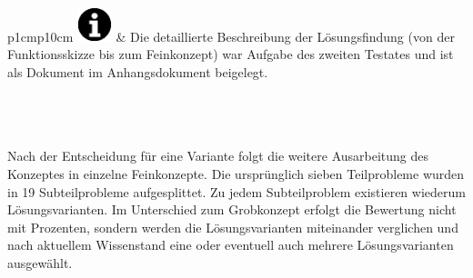 \begin{tabular}{p{1cm}p{10cm}}
		{\includegraphics[width=1cm]{Enddokumentation/Varianten/Bilder/info_icon.png}}
	 & Die detaillierte Beschreibung der Lösungsfindung (von der Funktionsskizze bis zum
	 Feinkonzept) war Aufgabe des zweiten Testates und ist als Dokument im Anhangsdokument beigelegt. \\
\end{tabular}\\
\\
\\
Nach der Entscheidung für eine Variante folgt die weitere Ausarbeitung des Konzeptes
in einzelne Feinkonzepte. Die ursprünglich sieben Teilprobleme wurden in 19 Subteilprobleme
aufgesplittet. Zu jedem Subteilproblem existieren wiederum Lösungsvarianten. Im Unterschied 
zum Grobkonzept erfolgt die Bewertung nicht mit Prozenten, sondern werden die Lösungsvarianten
miteinander verglichen und nach aktuellem Wissenstand eine oder eventuell auch mehrere
Lösungsvarianten ausgewählt. 


